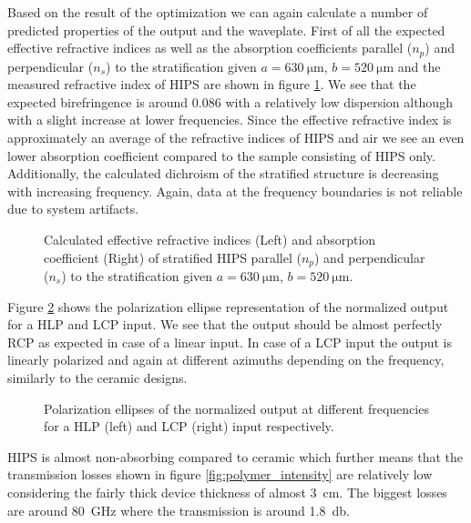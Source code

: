 Based on the result of the optimization we can again calculate a number of predicted properties of the output and the waveplate. First of all the expected effective refractive indices as well as the absorption coefficients parallel ($n_p$) and perpendicular ($n_s$) to the stratification given $a=\SI{630}{\micro \meter}$, $b=\SI{520}{\micro \meter}$ and the measured refractive index of HIPS are shown in figure \ref{fig:effective_ri_bf_hips}. We see that the expected birefringence is around $0.086$ with a relatively low dispersion although with a slight increase at lower frequencies. Since the effective refractive index is approximately an average of the refractive indices of HIPS and air we see an even lower absorption coefficient compared to the sample consisting of HIPS only. Additionally, the calculated dichroism of the stratified structure is decreasing with increasing frequency. Again, data at the frequency boundaries is not reliable due to system artifacts.

\begin{figure}[H]
    \centering
    
    \caption{Calculated effective refractive indices (Left) and absorption coefficient (Right) of stratified HIPS parallel ($n_p$) and perpendicular ($n_s$) to the stratification given $a=\SI{630}{\micro \meter}$, $b=\SI{520}{\micro \meter}$.}
    \label{fig:effective_ri_bf_hips}
\end{figure}

Figure \ref{fig:polymer_pe_lp} shows the polarization ellipse representation of the normalized output for a HLP and LCP input. We see that the output should be almost perfectly RCP as expected in case of a linear input. In case of a LCP input the output is linearly polarized and again at different azimuths depending on the frequency, similarly to the  ceramic designs. 

\begin{figure}[H]
    \centering
    
    \caption{Polarization ellipses of the normalized output at different frequencies for a HLP (left) and LCP (right) input respectively.}
    \label{fig:polymer_pe_lp}
\end{figure}

HIPS is almost non-absorbing compared to  ceramic which further means that the transmission losses shown in figure \ref{fig:polymer_intensity} are relatively low considering the fairly thick device thickness of almost \SI{3}{\centi \meter}. The biggest losses are around \SI{80}{\giga \hertz} where the transmission is around \SI{1.8}{\decibel}.

